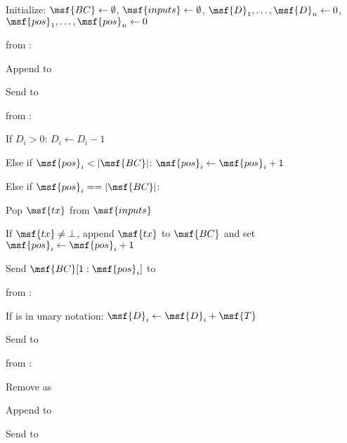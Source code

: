 \begin{bbox}[title={$\mathcal{F}_\msf{Atomic-Fetch-Delay}$}]

Initialize: $\msf{BC} \leftarrow \emptyset$, $\msf{inputs} \leftarrow \emptyset$, $\msf{D}_1, \dots, \msf{D}_n \leftarrow 0$, 
$\msf{pos}_1 , \dots, \msf{pos}_n \leftarrow 0$

\OnInput {} from \Partyi:
    
    \quad Append  to 
    
    \quad Send  to \Adv
    
\OnInput {} from \Partyi:

    \quad If $D_i > 0$: $D_i \leftarrow D_i - 1$
    
    \quad Else if $\msf{pos}_i < |\msf{BC}|$: $\msf{pos}_i \leftarrow \msf{pos}_i + 1$
        
    \quad Else if $\msf{pos}_i == |\msf{BC}|$:
        
        \qquad Pop $\msf{tx}$ from $\msf{inputs}$
        
        \qquad If $\msf{tx} \neq \bot$, append $\msf{tx}$ to $\msf{BC}$ and set $\msf{pos}_i \leftarrow \msf{pos}_i + 1$
        
    \quad Send $\msf{BC}[1:\msf{pos}_i]$ to \Partyi
    
\OnInput {} from \Adv:

    \quad If  is in unary notation: $\msf{D}_i \leftarrow \msf{D}_i + \msf{T}$
    
    \quad Send  to \Adv

\OnInput {} from \Adv:

    \quad Remove  as 
    
    \quad Append  to 
    
    \quad Send  to \Adv

\end{bbox}

